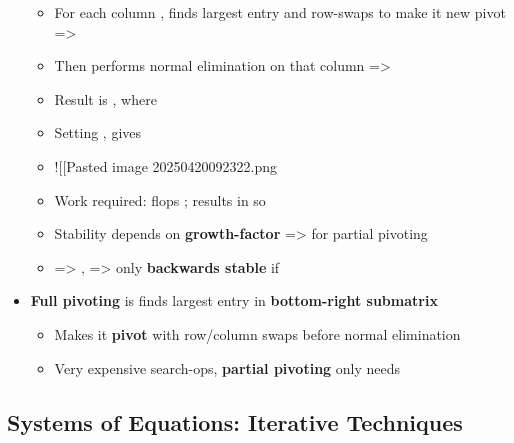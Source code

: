 \begin{itemize}
  \begin{itemize}
  
  \item
    For each column , finds largest entry and row-swaps to make
    it new pivot =\textgreater{} 
  \item
    Then performs normal elimination on that column =\textgreater{}
  \item
    Result is ,
    where
  \item
    Setting
    ,
     gives 
  \item
    !{[}{[}Pasted image 20250420092322.png\textbar450{]}{]}
  \item
    Work required:  flops
    ; results in
     so 
  \item
    Stability depends on \textbf{growth-factor}
    =\textgreater{} for partial pivoting 
  \item
     =\textgreater{}
    ,
    =\textgreater{} only \textbf{backwards stable} if 
  \end{itemize}
\item
  \textbf{Full pivoting} is  finds largest entry in
  \textbf{bottom-right submatrix}

  \begin{itemize}
  
  \item
    Makes it \textbf{pivot} with row/column swaps before normal
    elimination
  \item
    Very expensive  search-ops, \textbf{partial pivoting}
    only needs 
  \end{itemize}
\end{itemize}

\subsection*{Systems of Equations: Iterative
Techniques}

